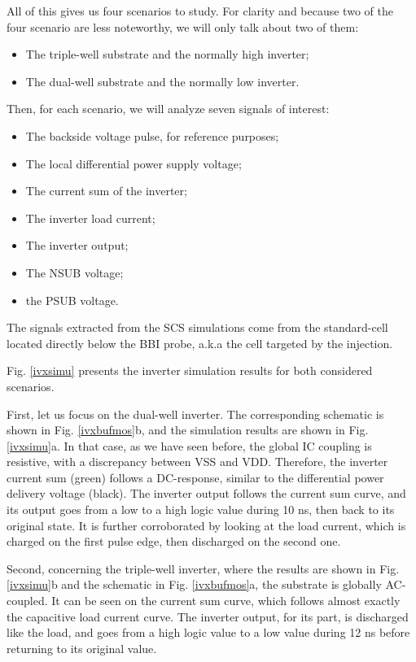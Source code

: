 		All of this gives us four scenarios	 to study.
		For clarity and because two of the four scenario are less noteworthy, we will only talk about two of them:
		\begin{itemize}
			\item The triple-well substrate and the normally high inverter;
			\item The dual-well substrate and the normally low inverter.
		\end{itemize}
		Then, for each scenario, we will analyze seven signals of interest:
		\begin{itemize}
			\item The backside voltage pulse, for reference purposes;
			\item The local differential power supply voltage;
			\item The current sum of the inverter;
			\item The inverter load current;
			\item The inverter output;
			\item The NSUB voltage;
			\item the PSUB voltage.
		\end{itemize}
		The signals extracted from the SCS simulations come from the standard-cell located directly below the BBI probe, a.k.a the cell targeted by the injection.
		
		Fig. \ref{ivxsimu} presents the inverter simulation results for both considered scenarios.

		First, let us focus on the dual-well inverter.
		The corresponding schematic is shown in Fig. \ref{ivxbufmos}b, and the simulation results are shown in Fig. \ref{ivxsimu}a.
		In that case, as we have seen before, the global IC coupling is resistive, with a discrepancy between VSS and VDD.
		Therefore, the inverter current sum (green) follows a DC-response, similar to the differential power delivery voltage (black).
		The inverter output follows the current sum curve, and its output goes from a low to a high logic value during 10 ns, then back to its original state.
		It is further corroborated by looking at the load current, which is charged on the first pulse edge, then discharged on the second one.

		Second, concerning the triple-well inverter, where the results are shown in Fig. \ref{ivxsimu}b and the schematic in Fig. \ref{ivxbufmos}a, the substrate is globally AC-coupled.
		It can be seen on the current sum curve, which follows almost exactly the capacitive load current curve.
		The inverter output, for its part, is discharged like the load, and goes from a high logic value to a low value during 12 ns before returning to its original value.

